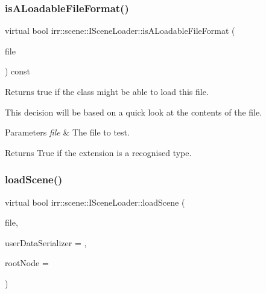 \subsubsection{\texorpdfstring{is\+A\+Loadable\+File\+Format()}{isALoadableFileFormat()}\hspace{0.1cm}{\footnotesize\ttfamily [2/2]}}
{\footnotesize\ttfamily virtual bool irr\+::scene\+::\+I\+Scene\+Loader\+::is\+A\+Loadable\+File\+Format (\begin{DoxyParamCaption}\item[{\hyperlink{classirr_1_1io_1_1IReadFile}{io\+::\+I\+Read\+File} $\ast$}]{file }\end{DoxyParamCaption}) const\hspace{0.3cm}{\ttfamily [pure virtual]}}



Returns true if the class might be able to load this file. 

This decision will be based on a quick look at the contents of the file. 
\begin{DoxyParams}{Parameters}
{\em file} & The file to test. \\
\hline
\end{DoxyParams}
\begin{DoxyReturn}{Returns}
True if the extension is a recognised type. 
\end{DoxyReturn}
\mbox{\label{classirr_1_1scene_1_1ISceneLoader_a55282c77040a78c2b172d77bbcff8ae8}} 
\subsubsection{\texorpdfstring{load\+Scene()}{loadScene()}\hspace{0.1cm}{\footnotesize\ttfamily [1/2]}}
{\footnotesize\ttfamily virtual bool irr\+::scene\+::\+I\+Scene\+Loader\+::load\+Scene (\begin{DoxyParamCaption}\item[{\hyperlink{classirr_1_1io_1_1IReadFile}{io\+::\+I\+Read\+File} $\ast$}]{file,  }\item[{\hyperlink{classirr_1_1scene_1_1ISceneUserDataSerializer}{I\+Scene\+User\+Data\+Serializer} $\ast$}]{user\+Data\+Serializer = {},  }\item[{\hyperlink{classirr_1_1scene_1_1ISceneNode}{I\+Scene\+Node} $\ast$}]{root\+Node = {} }\end{DoxyParamCaption})\hspace{0.3cm}{\ttfamily [pure virtual]}}



